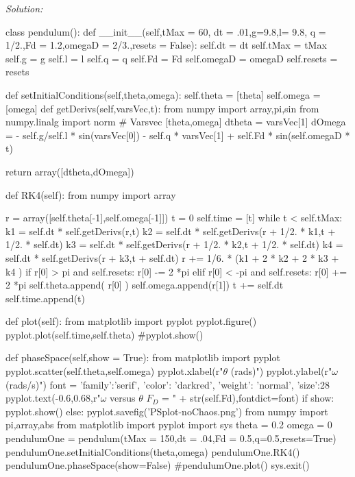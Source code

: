 \ifsolutions
\textit{Solution:}\\
\begin{codeexample}
\begin{VerbatimOut}{\listingFile}
class pendulum():
    def __init__(self,tMax = 60, dt = .01,g=9.8,l= 9.8, q = 1/2.,Fd = 1.2,omegaD = 2/3.,resets = False):
        self.dt = dt
        self.tMax = tMax
        self.g = g
        self.l = l
        self.q = q
        self.Fd = Fd
        self.omegaD = omegaD
        self.resets = resets

    def setInitialConditions(self,theta,omega):
        self.theta = [theta]
        self.omega = [omega]
    def getDerivs(self,varsVec,t):
        from numpy import array,pi,sin
        from numpy.linalg import norm
        # Varsvec [theta,omega]
        dtheta = varsVec[1]
        dOmega = - self.g/self.l * sin(varsVec[0]) - self.q * varsVec[1] + self.Fd * sin(self.omegaD * t)

        return array([dtheta,dOmega])


    def RK4(self):
        from numpy import array

        r = array([self.theta[-1],self.omega[-1]])
        t = 0
        self.time = [t]
        while t < self.tMax:
            k1 = self.dt * self.getDerivs(r,t)
            k2 = self.dt * self.getDerivs(r + 1/2. * k1,t + 1/2. * self.dt)
            k3 = self.dt * self.getDerivs(r + 1/2. * k2,t + 1/2. * self.dt)
            k4 = self.dt * self.getDerivs(r + k3,t +  self.dt)
            r += 1/6. * (k1 + 2 * k2 + 2 * k3 + k4 )
            if r[0] > pi and self.resets:
                r[0] -= 2 *pi
            elif r[0] < -pi and self.resets:
                r[0] += 2 *pi
            self.theta.append( r[0]  )
            self.omega.append(r[1])
            t += self.dt
            self.time.append(t)



    def plot(self):
        from matplotlib import pyplot
        pyplot.figure()
        pyplot.plot(self.time,self.theta)
        #pyplot.show()

    def phaseSpace(self,show = True):
        from matplotlib import pyplot
        pyplot.scatter(self.theta,self.omega)
        pyplot.xlabel(r"$\theta$ (rads)")
        pyplot.ylabel(r"$\omega$ (rads/s)")
        font = {'family':'serif',
                'color': 'darkred',
                'weight': 'normal',
                'size':28}
        pyplot.text(-0.6,0.68,r"$\omega$ versus $\theta$     $F_D$ = " + str(self.Fd),fontdict=font)
        if show:
            pyplot.show()
        else:
            pyplot.savefig('PSplot-noChaos.png')
from numpy import pi,array,abs
from matplotlib import pyplot
import sys
theta = 0.2
omega = 0
pendulumOne = pendulum(tMax = 150,dt = .04,Fd = 0.5,q=0.5,resets=True)
pendulumOne.setInitialConditions(theta,omega)
pendulumOne.RK4()
pendulumOne.phaseSpace(show=False)
#pendulumOne.plot()
sys.exit()


\end{VerbatimOut}
\end{codeexample}
